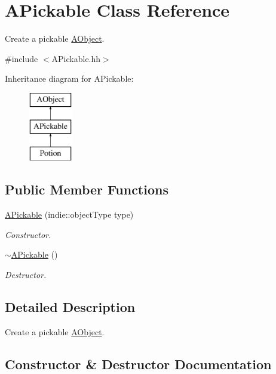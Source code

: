 \hypertarget{classAPickable}{}\section{A\+Pickable Class Reference}
\label{classAPickable}


Create a pickable \hyperlink{classAObject}{A\+Object}.  




{\ttfamily \#include $<$A\+Pickable.\+hh$>$}

Inheritance diagram for A\+Pickable\+:\begin{figure}[H]
\begin{center}
\leavevmode
\includegraphics[height=3.000000cm]{classAPickable}
\end{center}
\end{figure}
\subsection*{Public Member Functions}
\begin{DoxyCompactItemize}
\item 
\hyperlink{classAPickable_a6be5419f2699d070f6e41c29deca6272}{A\+Pickable} (indie\+::object\+Type type)
\begin{DoxyCompactList}\small\item\em Constructor. \end{DoxyCompactList}\item 
\hyperlink{classAPickable_a145013963070158596ad2e0d07065f5d}{$\sim$\+A\+Pickable} ()
\begin{DoxyCompactList}\small\item\em Destructor. \end{DoxyCompactList}\end{DoxyCompactItemize}


\subsection{Detailed Description}
Create a pickable \hyperlink{classAObject}{A\+Object}. 

\subsection{Constructor \& Destructor Documentation}
\mbox{\label{classAPickable_a6be5419f2699d070f6e41c29deca6272}} 
